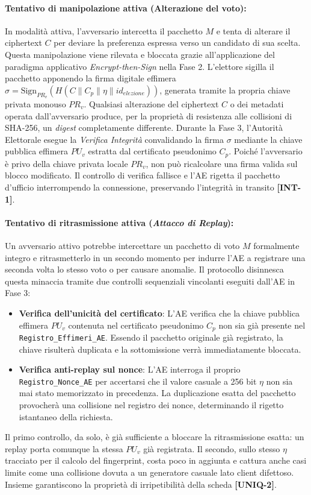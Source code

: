 \paragraph{Tentativo di manipolazione attiva (Alterazione del voto):} In modalità attiva, l'avversario intercetta il pacchetto $M$ e tenta di alterare il ciphertext $C$ per deviare la preferenza espressa verso un candidato di sua scelta. Questa manipolazione viene rilevata e bloccata grazie all'applicazione del paradigma applicativo \textit{Encrypt-then-Sign} nella Fase 2. L'elettore sigilla il pacchetto apponendo la firma digitale effimera $\sigma = \text{Sign}_{PR_v}(H(C \parallel C_p \parallel \eta \parallel id_{elezione}))$, generata tramite la propria chiave privata monouso $PR_v$. Qualsiasi alterazione del ciphertext $C$ o dei metadati operata dall'avversario produce, per la proprietà di resistenza alle collisioni di SHA-256, un \textit{digest} completamente differente. Durante la Fase 3, l'Autorità Elettorale esegue la \textit{Verifica Integrità} convalidando la firma $\sigma$ mediante la chiave pubblica effimera $PU_v$ estratta dal certificato pseudonimo $C_p$. Poiché l'avversario è privo della chiave privata locale $PR_v$, non può ricalcolare una firma valida sul blocco modificato. Il controllo di verifica fallisce e l'AE rigetta il pacchetto d'ufficio interrompendo la connessione, preservando l'integrità in transito \textbf{[INT-1]}.

\paragraph{Tentativo di ritrasmissione attiva (\textit{Attacco di Replay}):} Un avversario attivo potrebbe intercettare un pacchetto di voto $M$ formalmente integro e ritrasmetterlo in un secondo momento per indurre l'AE a registrare una seconda volta lo stesso voto o per causare anomalie. Il protocollo disinnesca questa minaccia tramite due controlli sequenziali vincolanti eseguiti dall'AE in Fase 3:
\begin{itemize}
    \item \textbf{Verifica dell'unicità del certificato}: L'AE verifica che la chiave pubblica effimera $PU_v$ contenuta nel certificato pseudonimo $C_p$ non sia già presente nel \texttt{Registro\_Effimeri\_AE}. Essendo il pacchetto originale già registrato, la chiave risulterà duplicata e la sottomissione verrà immediatamente bloccata.
    \item \textbf{Verifica anti-replay sul nonce}: L'AE interroga il proprio \texttt{Registro\_Nonce\_AE} per accertarsi che il valore casuale a 256 bit $\eta$ non sia mai stato memorizzato in precedenza. La duplicazione esatta del pacchetto provocherà una collisione nel registro dei nonce, determinando il rigetto istantaneo della richiesta.
\end{itemize}
Il primo controllo, da solo, è già sufficiente a bloccare la ritrasmissione esatta: un replay porta comunque la stessa $PU_v$ già registrata. Il secondo, sullo stesso $\eta$ tracciato per il calcolo del fingerprint, costa poco in aggiunta e cattura anche casi limite come una collisione dovuta a un generatore casuale lato client difettoso. Insieme garantiscono la proprietà di irripetibilità della scheda \textbf{[UNIQ-2]}.

